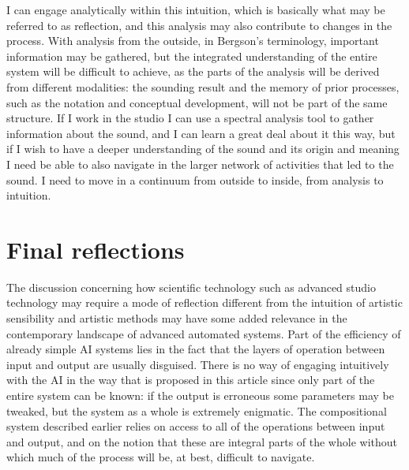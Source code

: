 \documentclass[11pt]{article}
\begin{document}
I can engage analytically within this intuition, which is basically what may be referred to as reflection, and this analysis may also contribute to changes in the process.
With analysis from the outside, in Bergson's terminology, important information may be gathered, but the integrated understanding of the entire system will be difficult to achieve, as the parts of the analysis will be derived from different modalities: the sounding result and the memory of prior processes, such as the notation and conceptual development, will not be part of the same structure.
If I work in the studio I can use a spectral analysis tool to gather information about the sound, and I can learn a great deal about it this way, but if I wish to have a deeper understanding of the sound and its origin and meaning I need be able to also navigate in the larger network of activities that led to the sound.
I need to move in a continuum from outside to inside, from analysis to intuition.
\section*{Final reflections}
\label{sec:org132b467}
The discussion concerning how scientific technology such as advanced studio technology may require a mode of reflection different from the intuition of artistic sensibility  and artistic methods may have some added relevance in the contemporary landscape of advanced automated systems.
Part of the efficiency of already simple AI systems lies in the fact that the layers of operation between input and output are usually disguised.
There is no way of engaging intuitively with the AI in the way that is proposed in this article since only part of the entire system can be known: if the output is erroneous some parameters may be tweaked, but the system as a whole is extremely enigmatic.
The compositional system described earlier relies on access to all of the operations between input and output, and on the notion that these are integral parts of the whole without which much of the process will be, at best, difficult to navigate.
\end{document}
